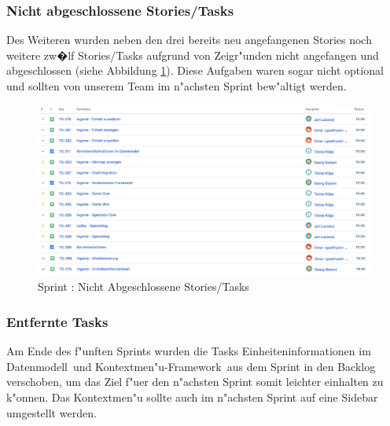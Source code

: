 \documentclass[12pt, titlepage]{scrartcl}
\newcommand{\RN}[1]{%
	\textup{\uppercase\expandafter{\romannumeral#1}}%
}
\begin{document}
        	\subsubsection{Nicht abgeschlossene Stories/Tasks}
        		Des Weiteren wurden neben den drei bereits neu angefangenen Stories noch weitere zw�lf Stories/Tasks aufgrund von Zeigr"unden nicht angefangen und abgeschlossen (siehe Abbildung \ref{To_Do_5}). Diese Aufgaben waren sogar nicht optional und sollten von unserem Team im n"achsten Sprint bew"altigt werden.
        		\begin{figure}[H] 
        			\centering
        			\includegraphics[width=\textwidth]{images/sprintV/toDo.png}
        			\caption{Sprint \RN{5}: Nicht Abgeschlossene Stories/Tasks}
        			\label{To_Do_5}
        		\end{figure}
        	\subsubsection{Entfernte Tasks}
        		Am Ende des f"unften Sprints wurden die Tasks \glqq Einheiteninformationen im Datenmodell\grqq\ und \glqq Kontextmen"u-Framework\grqq\ aus dem Sprint in den Backlog verschoben, um das Ziel f"uer den n"achsten Sprint somit leichter einhalten zu k"onnen. Das Kontextmen"u sollte auch im n"achsten Sprint auf eine Sidebar umgestellt werden. 
\end{document}
